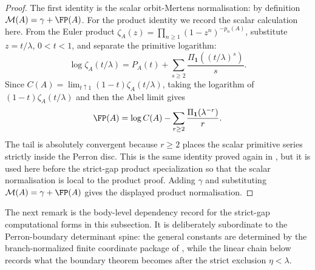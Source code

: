 \begin{proof}
  The first identity is the scalar orbit-Mertens normalisation: by definition
  \(\mathcal M(A)=\gamma+\FP(A)\).  For the product identity we record the
  scalar calculation here.  From the Euler product
  \(\zeta_A(z)=\prod_{n\ge1}(1-z^n)^{-p_n(A)}\), substitute
  \(z=t/\lambda\), \(0<t<1\), and separate the primitive logarithm:
  \[
    \log\zeta_A(t/\lambda)
    =P_A(t)+\sum_{s\ge2}\frac{\Pi_{\mathbf1}((t/\lambda)^s)}{s}.
  \]
  Since \(C(A)=\lim_{t\uparrow1}(1-t)\zeta_A(t/\lambda)\), taking the logarithm
  of \((1-t)\zeta_A(t/\lambda)\) and then the Abel limit gives
  \[
    \FP(A)=\log C(A)-
      \sum_{r\ge2}\frac{\Pi_{\mathbf1}(\lambda^{-r})}{r}.
  \]
  The tail is absolutely convergent because \(r\ge2\) places the scalar
  primitive series strictly inside the Perron disc.  This is the same identity
  proved again in , but it is used
  here before the strict-gap product specialization so that the scalar
  normalisation is local to the product proof.
  Adding \(\gamma\) and substituting
  \(\mathcal M(A)=\gamma+\FP(A)\) gives the displayed product normalisation.
\end{proof}

The next remark is the body-level dependency record for the strict-gap
computational forms in this subsection.  It is deliberately subordinate to the
Perron-boundary determinant spine: the general constants are determined by the
branch-normalized finite coordinate package of
, while the linear chain below
records what the boundary theorem becomes after the strict exclusion
\(\eta<\lambda\).

